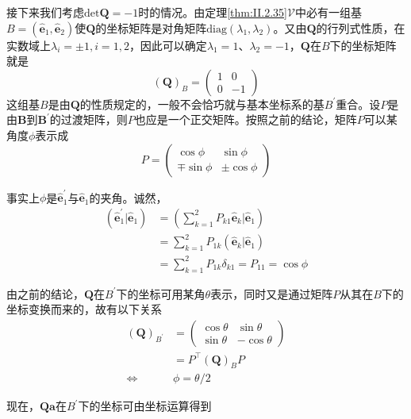 \documentclass[../main.tex]{subfiles}
\begin{document}
接下来我们考虑$\mathrm{det}\mathbf{Q}=-1$时的情况。由定理\ref{thm:II.2.35}$\mathcal{V}$中必有一组基$B=\left(\mathbf{\hat{e}}_1,\mathbf{\hat{e}}_2\right)$使$\mathbf{Q}$的坐标矩阵是对角矩阵$\mathrm{diag}\left(\lambda_1,\lambda_2\right)$。又由$\mathbf{Q}$的行列式性质，在实数域上$\lambda_i=\pm 1,i=1,2$，因此可以确定$\lambda_1=1$、$\lambda_2=-1$，$\mathbf{Q}$在$B$下的坐标矩阵就是
\[\left(\mathbf{Q}\right)_B=\left(\begin{array}{cc}1&0\\0&-1\end{array}\right)\]
这组基$B$是由$\mathbf{Q}$的性质规定的，一般不会恰巧就与基本坐标系的基$B^\prime$重合。设$P$是由$\mathbf{B}$到$\mathbf{B}^\prime$的过渡矩阵，则$P$也应是一个正交矩阵。按照之前的结论，矩阵$P$可以某角度$\phi$表示成
\[P=\left(\begin{array}{cc}\cos\phi&\sin\phi\\\mp\sin\phi&\pm\cos\phi\end{array}\right)\]

事实上$\phi$是$\mathbf{\hat{e}}^\prime_1$与$\mathbf{\hat{e}}_1$的夹角。诚然，
\begin{align*}
    \left(\mathbf{\hat{e}}^\prime_1|\mathbf{\hat{e}}_1\right) & =\left(\sum_{k=1}^2P_{k1}\mathbf{\hat{e}}_k|\mathbf{\hat{e}}_1\right) \\
                                                              & =\sum_{k=1}^2P_{1k}\left(\mathbf{\hat{e}}_k|\mathbf{\hat{e}}_1\right) \\
                                                              & =\sum_{k=1}^2P_{1k}\delta_{k1}=P_{11}=\cos\phi
\end{align*}

由之前的结论，$\mathbf{Q}$在$B^\prime$下的坐标可用某角$\theta$表示，同时又是通过矩阵$P$从其在$B$下的坐标变换而来的，故有以下关系
\begin{align*}
    \left(\mathbf{Q}\right)_{B^\prime} & =\left(\begin{array}{cc}\cos\theta&\sin\theta\\\sin\theta&-\cos\theta\end{array}\right) \\
                                       & =P^{\intercal}\left(\mathbf{Q}\right)_BP                                                \\
    \Leftrightarrow                    & \phi=\theta/2
\end{align*}

现在，$\mathbf{Qa}$在$B^\prime$下的坐标可由坐标运算得到
\end{document}
